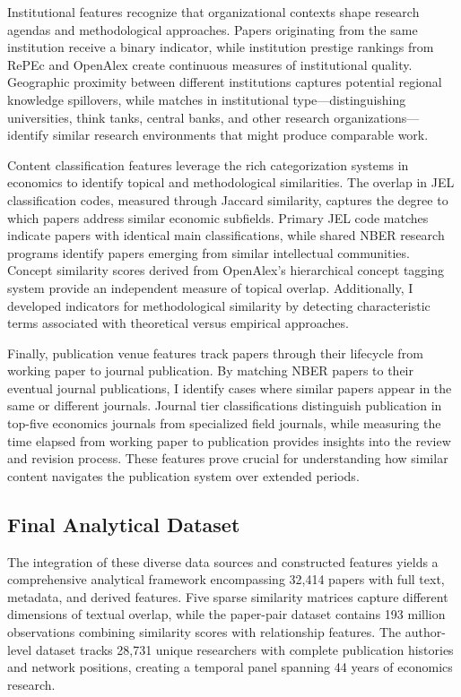\documentclass[12pt]{article}
\begin{document}
Institutional features recognize that organizational contexts shape research agendas and methodological approaches. Papers originating from the same institution receive a binary indicator, while institution prestige rankings from RePEc and OpenAlex create continuous measures of institutional quality. Geographic proximity between different institutions captures potential regional knowledge spillovers, while matches in institutional type—distinguishing universities, think tanks, central banks, and other research organizations—identify similar research environments that might produce comparable work.

Content classification features leverage the rich categorization systems in economics to identify topical and methodological similarities. The overlap in JEL classification codes, measured through Jaccard similarity, captures the degree to which papers address similar economic subfields. Primary JEL code matches indicate papers with identical main classifications, while shared NBER research programs identify papers emerging from similar intellectual communities. Concept similarity scores derived from OpenAlex's hierarchical concept tagging system provide an independent measure of topical overlap. Additionally, I developed indicators for methodological similarity by detecting characteristic terms associated with theoretical versus empirical approaches.

Finally, publication venue features track papers through their lifecycle from working paper to journal publication. By matching NBER papers to their eventual journal publications, I identify cases where similar papers appear in the same or different journals. Journal tier classifications distinguish publication in top-five economics journals from specialized field journals, while measuring the time elapsed from working paper to publication provides insights into the review and revision process. These features prove crucial for understanding how similar content navigates the publication system over extended periods.

\subsection{Final Analytical Dataset}

The integration of these diverse data sources and constructed features yields a comprehensive analytical framework encompassing 32,414 papers with full text, metadata, and derived features. Five sparse similarity matrices capture different dimensions of textual overlap, while the paper-pair dataset contains 193 million observations combining similarity scores with relationship features. The author-level dataset tracks 28,731 unique researchers with complete publication histories and network positions, creating a temporal panel spanning 44 years of economics research.
\end{document}
